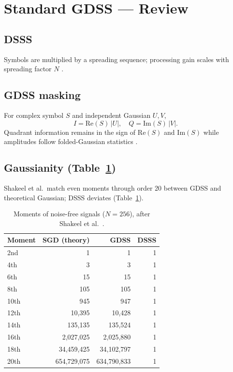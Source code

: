 \documentclass[10pt,a4paper,twocolumn]{article}
\begin{document}
\section{Standard GDSS --- Review}
\subsection{DSSS}
Symbols are multiplied by a spreading sequence; processing gain scales with spreading factor $N$ \cite{shakeel2023}.

\subsection{GDSS masking}
For complex symbol $S$ and independent Gaussian $U,V$,
\begin{equation}
I = \mathrm{Re}(S)\,|U|,\quad Q = \mathrm{Im}(S)\,|V|.
\label{eq:gdssmask}
\end{equation}
Quadrant information remains in the sign of $\mathrm{Re}(S)$ and $\mathrm{Im}(S)$ while amplitudes follow folded-Gaussian statistics \cite{shakeel2023}.

\subsection{Gaussianity (Table~\ref{tab:moments})}
Shakeel et al.\ match even moments through order 20 between GDSS and theoretical Gaussian; DSSS deviates (Table~\ref{tab:moments}).

\begin{table}[t]
\centering
\caption{Moments of noise-free signals ($N{=}256$), after Shakeel et al.\ \cite{shakeel2023}.}
\label{tab:moments}
\small
\begin{tabular}{@{}lrrr@{}}
\toprule
Moment & SGD (theory) & GDSS & DSSS \\
\midrule
2nd & 1 & 1 & 1 \\
4th & 3 & 3 & 1 \\
6th & 15 & 15 & 1 \\
8th & 105 & 105 & 1 \\
10th & 945 & 947 & 1 \\
12th & 10{,}395 & 10{,}428 & 1 \\
14th & 135{,}135 & 135{,}524 & 1 \\
16th & 2{,}027{,}025 & 2{,}025{,}880 & 1 \\
18th & 34{,}459{,}425 & 34{,}102{,}797 & 1 \\
20th & 654{,}729{,}075 & 634{,}790{,}833 & 1 \\
\bottomrule
\end{tabular}
\end{table}
\end{document}
